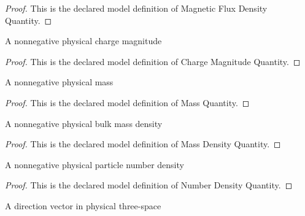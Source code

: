 \begin{proof}
  This is the declared model definition of Magnetic Flux Density Quantity.
\end{proof}
\begin{definition}
  \label{def:physics:phyx-mini-0626:phyxminiproblems-problemphyxmini0626-chargemagnitudequantity}
  A nonnegative physical charge magnitude
\end{definition}
\begin{proof}
  This is the declared model definition of Charge Magnitude Quantity.
\end{proof}
\begin{definition}
  \label{def:physics:phyx-mini-0626:phyxminiproblems-problemphyxmini0626-massquantity}
  A nonnegative physical mass
\end{definition}
\begin{proof}
  This is the declared model definition of Mass Quantity.
\end{proof}
\begin{definition}
  \label{def:physics:phyx-mini-0626:phyxminiproblems-problemphyxmini0626-massdensityquantity}
  A nonnegative physical bulk mass density
\end{definition}
\begin{proof}
  This is the declared model definition of Mass Density Quantity.
\end{proof}
\begin{definition}
  \label{def:physics:phyx-mini-0626:phyxminiproblems-problemphyxmini0626-numberdensityquantity}
  A nonnegative physical particle number density
\end{definition}
\begin{proof}
  This is the declared model definition of Number Density Quantity.
\end{proof}
\begin{definition}
  \label{def:physics:phyx-mini-0626:phyxminiproblems-problemphyxmini0626-spatialdirection}
  A direction vector in physical three-space
\end{definition}
